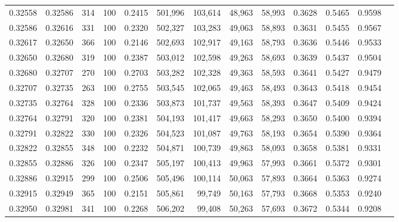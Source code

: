 \begin{tabular}{rrrrrrrrrrrrr}
0.32558 & 0.32586 &   314 & 100 &                                     0.2415 & 501,996 & 103,614 &  48,963 &  58,993 & 0.3628 & 0.5465 & 0.9598 \\
0.32586 & 0.32616 &   331 & 100 &                                     0.2320 & 502,327 & 103,283 &  49,063 &  58,893 & 0.3631 & 0.5455 & 0.9567 \\
0.32617 & 0.32650 &   366 & 100 &                                     0.2146 & 502,693 & 102,917 &  49,163 &  58,793 & 0.3636 & 0.5446 & 0.9533 \\
0.32650 & 0.32680 &   319 & 100 &                                     0.2387 & 503,012 & 102,598 &  49,263 &  58,693 & 0.3639 & 0.5437 & 0.9504 \\
0.32680 & 0.32707 &   270 & 100 &                                     0.2703 & 503,282 & 102,328 &  49,363 &  58,593 & 0.3641 & 0.5427 & 0.9479 \\
0.32707 & 0.32735 &   263 & 100 &                                     0.2755 & 503,545 & 102,065 &  49,463 &  58,493 & 0.3643 & 0.5418 & 0.9454 \\
0.32735 & 0.32764 &   328 & 100 &                                     0.2336 & 503,873 & 101,737 &  49,563 &  58,393 & 0.3647 & 0.5409 & 0.9424 \\
0.32764 & 0.32791 &   320 & 100 &                                     0.2381 & 504,193 & 101,417 &  49,663 &  58,293 & 0.3650 & 0.5400 & 0.9394 \\
0.32791 & 0.32822 &   330 & 100 &                                     0.2326 & 504,523 & 101,087 &  49,763 &  58,193 & 0.3654 & 0.5390 & 0.9364 \\
0.32822 & 0.32855 &   348 & 100 &                                     0.2232 & 504,871 & 100,739 &  49,863 &  58,093 & 0.3658 & 0.5381 & 0.9331 \\
0.32855 & 0.32886 &   326 & 100 &                                     0.2347 & 505,197 & 100,413 &  49,963 &  57,993 & 0.3661 & 0.5372 & 0.9301 \\
0.32886 & 0.32915 &   299 & 100 &                                     0.2506 & 505,496 & 100,114 &  50,063 &  57,893 & 0.3664 & 0.5363 & 0.9274 \\
0.32915 & 0.32949 &   365 & 100 &                                     0.2151 & 505,861 &  99,749 &  50,163 &  57,793 & 0.3668 & 0.5353 & 0.9240 \\
0.32950 & 0.32981 &   341 & 100 &                                     0.2268 & 506,202 &  99,408 &  50,263 &  57,693 & 0.3672 & 0.5344 & 0.9208 \\

\end{tabular}
